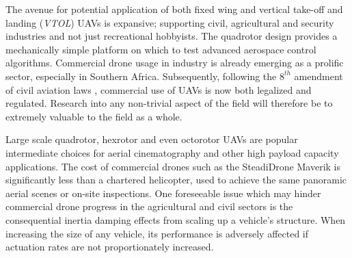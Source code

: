 \par
The avenue for potential application of both fixed wing and vertical take-off and landing (\emph{VTOL}) UAVs is expansive; supporting civil\cite{civilquadcopter}, agricultural\cite{agriculturequadcopter} and security\cite{videosurveillancequadcopter} industries and not just recreational hobbyists. The quadrotor design provides a mechanically simple platform on which to test advanced aerospace control algorithms. Commercial drone usage in industry is already emerging as a prolific sector, especially in Southern Africa. Subsequently, following the $8^{th}$ amendment of civil aviation laws \cite{dronelaw}, commercial use of UAVs is now both legalized and regulated. Research into any non-trivial aspect of the field will therefore be to extremely valuable to the field as a whole. 
\par
Large scale quadrotor, hexrotor and even octorotor UAVs are popular intermediate choices for aerial cinematography and other high payload capacity applications. The cost of commercial drones such as the SteadiDrone Maverik \cite{steadidrone} is significantly less than a chartered helicopter, used to achieve the same panoramic aerial scenes or on-site inspections. One foreseeable issue which may hinder commercial drone progress in the agricultural and civil sectors is the consequential inertia damping effects from scaling up a vehicle's structure. When increasing the size of any vehicle, its performance is adversely affected if actuation rates are not proportionately increased.
